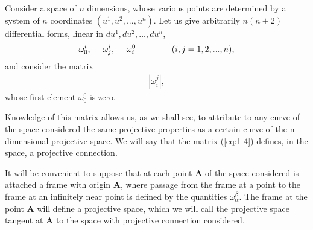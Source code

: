 Consider a space of $n$ dimensions, whose various points are determined by a system of $n$ coordinates $(u^1, u^2, ..., u^n)$. Let us give arbitrarily $n(n+2)$ differential forms, linear in $du^1, du^2, ..., du^n$,
\begin{eqnarray*}
\omega^i_0, \ \ \ \ \omega^i_j, \ \ \ \ \omega^0_i \hspace*{1.5cm} (i,j = 1,2,...,n),
\end{eqnarray*}
and consider the matrix
\begin{eqnarray}
| \omega^j_i |,
\label{eq:1-4}
\end{eqnarray}
whose first element $\omega^0_0$ is zero.

Knowledge of this matrix allows us, as we shall see, to attribute to any curve of the space considered the same projective properties as a certain curve of the n-dimensional projective space. We will say that the matrix (\ref{eq:1-4}) defines, in the space, a projective connection.

It will be convenient to suppose that at each point $\bm A$ of the space considered is attached a frame with origin $\bm A$, where passage from the frame at a point to the frame at an infinitely near point is defined by the quantities $\omega^\beta_\alpha$. The frame at the point $\bm A$ will define a projective space, which we will call the projective space tangent at $\bm A$ to the space with projective connection considered.
































































































